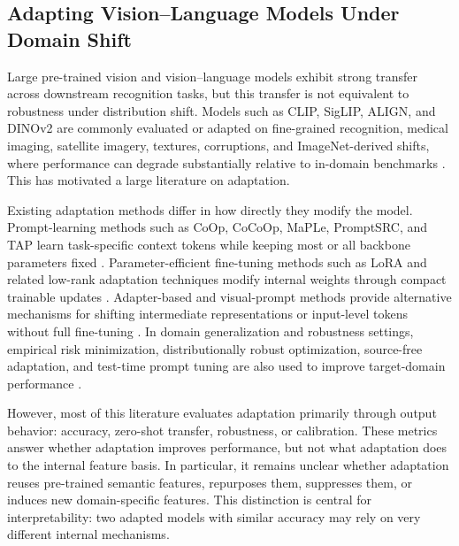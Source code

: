 

\subsection{Adapting Vision--Language Models Under Domain Shift}

Large pre-trained vision and vision--language models exhibit strong transfer across downstream recognition tasks, but this transfer is not equivalent to robustness under distribution shift. Models such as CLIP, SigLIP, ALIGN, and DINOv2 are commonly evaluated or adapted on fine-grained recognition, medical imaging, satellite imagery, textures, corruptions, and ImageNet-derived shifts, where performance can degrade substantially relative to in-domain benchmarks \citep{radford2021learning, zhai2023sigmoid, jia2021scaling, oquab2024dinov2, hendrycks2019benchmarking}. This has motivated a large literature on adaptation.

Existing adaptation methods differ in how directly they modify the model. Prompt-learning methods such as CoOp, CoCoOp, MaPLe, PromptSRC, and TAP learn task-specific context tokens while keeping most or all backbone parameters fixed \citep{zhou2022learning, zhou2022conditional, khattak2023maple, khattak2023promptsrc, ding2025tap}. Parameter-efficient fine-tuning methods such as LoRA and related low-rank adaptation techniques modify internal weights through compact trainable updates \citep{hu2022lora}. Adapter-based and visual-prompt methods provide alternative mechanisms for shifting intermediate representations or input-level tokens without full fine-tuning \citep{gao2024clipadapter, jia2022visual}. In domain generalization and robustness settings, empirical risk minimization, distributionally robust optimization, source-free adaptation, and test-time prompt tuning are also used to improve target-domain performance \citep{sagawa2020distributionally, singha2023ad, shu2022tpt}.

However, most of this literature evaluates adaptation primarily through output behavior: accuracy, zero-shot transfer, robustness, or calibration. These metrics answer whether adaptation improves performance, but not what adaptation does to the internal feature basis. In particular, it remains unclear whether adaptation reuses pre-trained semantic features, repurposes them, suppresses them, or induces new domain-specific features. This distinction is central for interpretability: two adapted models with similar accuracy may rely on very different internal mechanisms.


